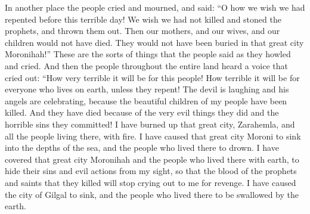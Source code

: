 In another place the people cried and mourned, and said: ``O how we wish we had repented before this terrible day! We wish we had not killed and stoned the prophets, and thrown them out. Then our mothers, and our wives, and our children would not have died. They would not have been buried in that great city Moronihah!'' These are the sorts of things that the people said as they howled and cried.
\bchapter
\bverse \iffalse And it came to pass that there was a voice heard among all the inhabitants of the earth, upon all the face of this land, crying: \fi
And then the people throughout the entire land heard a voice that cried out:
\bverse \iffalse Wo, wo, wo unto this people; wo unto the inhabitants of the whole earth except they shall repent; for the devil laugheth, and his angels rejoice, because of the slain of the fair sons and daughters of my people; and it is because of their iniquity and abominations that they are fallen! \fi
``How very terrible it will be for this people! How terrible it will be for everyone who lives on earth, unless they repent! The devil is laughing and his angels are celebrating, because the beautiful children of my people have been killed. And they have died because of the very evil things they did and the horrible sins they committed!
\bverse \iffalse Behold, that great city Zarahemla have I burned with fire, and the inhabitants thereof. \fi
I have burned up that great city, Zarahemla, and all the people living there, with fire.
\bverse \iffalse And behold, that great city Moroni have I caused to be sunk in the depths of the sea, and the inhabitants thereof to be drowned. \fi
I have caused that great city Moroni to sink into the depths of the sea, and the people who lived there to drown.
\bverse \iffalse And behold, that great city Moronihah have I covered with earth, and the inhabitants thereof, to hide their iniquities and their abominations from before my face, that the blood of the prophets and the saints shall not come any more unto me against them. \fi
I have covered that great city Moronihah and the people who lived there with earth, to hide their sins and evil actions from my sight, so that the blood of the prophets and saints that they killed will stop crying out to me for revenge.
\bverse \iffalse And behold, the city of Gilgal have I caused to be sunk, and the inhabitants thereof to be buried up in the depths of the earth; \fi
I have caused the city of Gilgal to sink, and the people who lived there to be swallowed by the earth.
